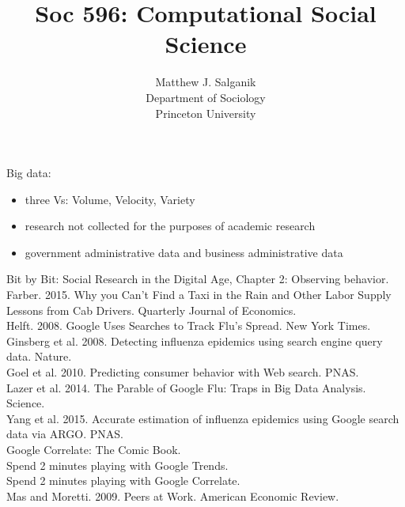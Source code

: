 \documentclass{beamer}
\title[]{Soc 596: Computational Social Science}
\author[]{Matthew J. Salganik\\Department of Sociology\\Princeton University}
\date[]{01-04-Preview for next class (Big Data)
\vfill
\begin{flushright}
\vspace{0.6in}
\texttt{[image: figures/cc.png]}
\end{flushright}
}
\begin{document}
\frame{\titlepage}
\begin{frame}

Big data:\\
\begin{itemize}
\item three Vs: Volume, Velocity, Variety
\item research not collected for the purposes of academic research
\item government administrative data and business administrative data
\end{itemize}

\end{frame}
\begin{frame}

Bit by Bit: Social Research in the Digital Age, Chapter 2: Observing behavior.\\

Farber. 2015. Why you Can't Find a Taxi in the Rain and Other Labor Supply Lessons from Cab Drivers. Quarterly Journal of Economics.\\

Helft. 2008. Google Uses Searches to Track Flu's Spread. New York Times.\\
Ginsberg et al. 2008. Detecting influenza epidemics using search engine query data. Nature.\\
Goel et al. 2010. Predicting consumer behavior with Web search. PNAS.\\
Lazer et al. 2014. The Parable of Google Flu: Traps in Big Data Analysis. Science.\\
Yang et al. 2015. Accurate estimation of influenza epidemics using Google search data via ARGO. PNAS.\\
Google Correlate: The Comic Book.\\
Spend 2 minutes playing with Google Trends.\\
Spend 2 minutes playing with Google Correlate.\\

Mas and Moretti. 2009. Peers at Work. American Economic Review.\\
 
\end{frame}
\end{document}
